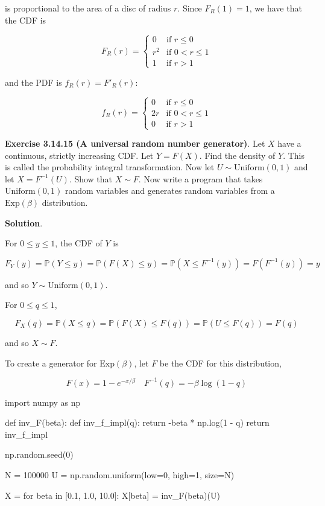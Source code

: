 is proportional to the area of a disc of radius \(r\). Since
\(F_R(1) = 1\), we have that the CDF is

\[ 
F_R(r) = \begin{cases}
0 &\text{if } r \leq 0 \\
r^2 &\text{if } 0 < r \leq 1 \\
1 &\text{if } r > 1
\end{cases}
\]

and the PDF is \(f_R(r) = F'_R(r)\):

\[
f_R(r) = \begin{cases}
0 &\text{if } r \leq 0 \\
2 r &\text{if } 0 < r \leq 1 \\
0 &\text{if } r > 1
\end{cases}
\]

\textbf{Exercise 3.14.15 (A universal random number generator)}. Let
\(X\) have a continuous, strictly increasing CDF. Let \(Y = F(X)\). Find
the density of \(Y\). This is called the probability integral
transformation. Now let \(U \sim \text{Uniform}(0, 1)\) and let
\(X = F^{-1}(U)\). Show that \(X \sim F\). Now write a program that
takes \(\text{Uniform}(0, 1)\) random variables and generates random
variables from a \(\text{Exp}(\beta)\) distribution.

\textbf{Solution}.

For \(0 \leq y \leq 1\), the CDF of \(Y\) is

\[ F_Y(y) = \mathbb{P}(Y \leq y) = \mathbb{P}(F(X) \leq y) = \mathbb{P}(X \leq F^{-1}(y)) = F(F^{-1}(y)) = y\]

and so \(Y \sim \text{Uniform}(0, 1)\).

For \(0 \leq q \leq 1\),

\[ F_X(q) = \mathbb{P}(X \leq q) = \mathbb{P}(F(X) \leq F(q)) = \mathbb{P}(U \leq F(q)) = F(q) \]

and so \(X \sim F\).

To create a generator for \(\text{Exp}(\beta)\), let \(F\) be the CDF
for this distribution,

\[ F(x) = 1 - e^{-x/\beta} \quad F^{-1}(q) = - \beta \log (1 - q) \]

\begin{python}
import numpy as np

def inv_F(beta):
    def inv_f_impl(q):
        return -beta * np.log(1 - q)
    return inv_f_impl
\end{python}

\begin{python}
np.random.seed(0)

N = 100000
U = np.random.uniform(low=0, high=1, size=N)

X = {}
for beta in [0.1, 1.0, 10.0]:
    X[beta] = inv_F(beta)(U)
\end{python}

